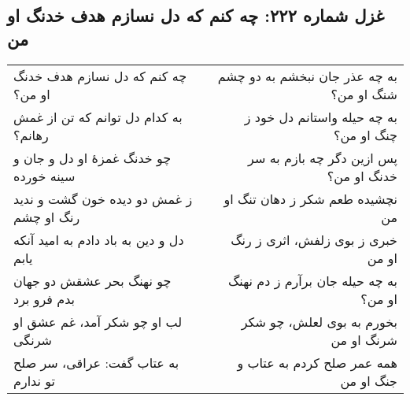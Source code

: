 \begin{center}
\section*{غزل شماره ۲۲۲: چه کنم که دل نسازم هدف خدنگ او من}
\label{sec:222}
\begin{longtable}{l p{0.5cm} r}
چه کنم که دل نسازم هدف خدنگ او من؟
&&
به چه عذر جان نبخشم به دو چشم شنگ او من؟
\\
به کدام دل توانم که تن از غمش رهانم؟
&&
به چه حیله واستانم دل خود ز چنگ او من؟
\\
چو خدنگ غمزهٔ او دل و جان و سینه خورده
&&
پس ازین دگر چه بازم به سر خدنگ او من؟
\\
ز غمش دو دیده خون گشت و ندید رنگ او چشم
&&
نچشیده طعم شکر ز دهان تنگ او من
\\
دل و دین به باد دادم به امید آنکه یابم
&&
خبری ز بوی زلفش، اثری ز رنگ او من
\\
چو نهنگ بحر عشقش دو جهان بدم فرو برد
&&
به چه حیله جان برآرم ز دم نهنگ او من؟
\\
لب او چو شکر آمد، غم عشق او شرنگی
&&
بخورم به بوی لعلش، چو شکر شرنگ او من
\\
به عتاب گفت: عراقی، سر صلح تو ندارم
&&
همه عمر صلح کردم به عتاب و جنگ او من
\\
\end{longtable}
\end{center}
